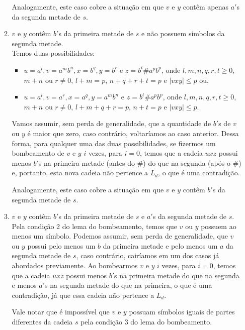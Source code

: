 \begin{enumerate}[label={\textbf{\alph*.}}]
\begin{enumerate}[label={\textbf{Caso \arabic*:}}]
        Analogamente, este caso cobre a situação em que $v$ e $y$ contêm apenas $a'$s da segunda metade de $s$.
        
        \item $v$ e $y$ contêm $b'$s da primeira metade de $s$ e não possuem símbolos da segunda metade.\\[2pt]
        Temos duas possibilidades:
        \begin{itemize}
            \item $u = a^l, v = a^mb^n, x = b^q, y = b^r$ e $z = b^t\texttt{\#}a^pb^p$, onde $l, m, n, q, r, t \geq 0$, $m + n$ ou $r \neq 0$, $l + m = p$, $n + q + r + t = p$ e $|vxy| \leq p$ ou,
            
            \item $u = a^l, v = a^r, x = a^q, y = a^mb^n$ e $z = b^t\texttt{\#}a^pb^p$, onde $l, m, n, q, r, t \geq 0$, $m + n$ ou $r \neq 0$, $l + m + q + r = p$, $n + t = p$ e $|vxy| \leq p$.
        \end{itemize}
        
        Vamos assumir, sem perda de generalidade, que a quantidade de $b'$s de $v$ ou $y$ é maior que zero, caso contrário, voltaríamos ao caso anterior. Dessa forma, para qualquer uma das duas possibilidades, se fizermos um bombeamento de $v$ e $y$ $i$ vezes, para $i = 0$, temos que a cadeia $uxz$ possui menos $b'$s na primeira metade (antes do $\texttt{\#}$) do que na segunda (após o $\texttt{\#}$) e, portanto, esta nova cadeia não pertence a $L_d$, o que é uma contradição.
        
        Analogamente, este caso cobre a situação em que $v$ e $y$ contêm $b'$s da segunda metade de $s$.

        \item $v$ e $y$ contêm $b'$s da primeira metade de $s$ e $a'$s da segunda metade de $s$.\\[2pt]
        Pela condição 2 do lema do bombeamento, temos que $v$ ou $y$ possuem ao menos um símbolo. Podemos assumir, sem perda de generalidade, que $v$ ou $y$ possui pelo menos um $b$ da primeira metade e pelo menos um $a$ da segunda metade de $s$, caso contrário, cairíamos em um dos casos já abordados previamente. Ao bombearmos $v$ e $y$ $i$ vezes, para $i = 0$, temos que a cadeia $uxz$ possui menos $b'$s na primeira metade do que na segunda e menos $a'$s na segunda metade do que na primeira, o que é uma contradição, já que essa cadeia não pertence a $L_d$.
        
        Vale notar que é impossível que $v$ e $y$ possuam símbolos iguais de partes diferentes da cadeia $s$ pela condição 3 do lema do bombeamento.
    \end{enumerate}

\end{enumerate}